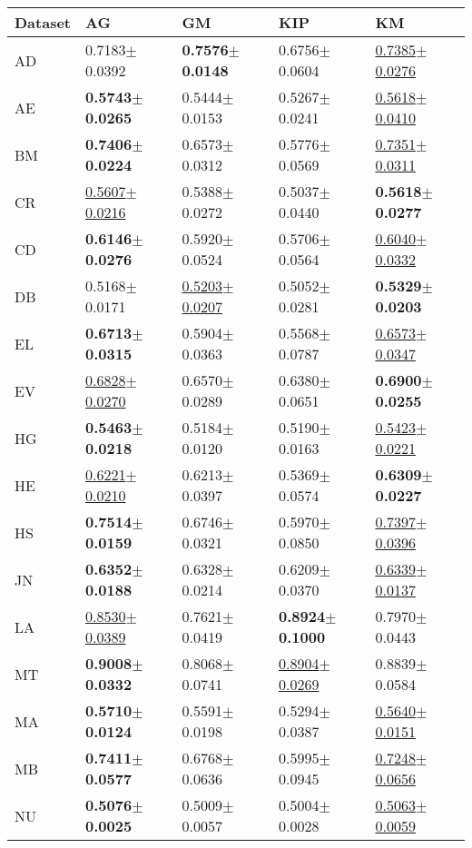 \begin{tabular}{lllll}
\toprule
Dataset & AG & GM & KIP & KM \\
\midrule
AD & 0.7183$\pm$0.0392 & \textbf{0.7576$\pm$0.0148} & 0.6756$\pm$0.0604 & \underline{0.7385$\pm$0.0276} \\
AE & \textbf{0.5743$\pm$0.0265} & 0.5444$\pm$0.0153 & 0.5267$\pm$0.0241 & \underline{0.5618$\pm$0.0410} \\
BM & \textbf{0.7406$\pm$0.0224} & 0.6573$\pm$0.0312 & 0.5776$\pm$0.0569 & \underline{0.7351$\pm$0.0311} \\
CR & \underline{0.5607$\pm$0.0216} & 0.5388$\pm$0.0272 & 0.5037$\pm$0.0440 & \textbf{0.5618$\pm$0.0277} \\
CD & \textbf{0.6146$\pm$0.0276} & 0.5920$\pm$0.0524 & 0.5706$\pm$0.0564 & \underline{0.6040$\pm$0.0332} \\
DB & 0.5168$\pm$0.0171 & \underline{0.5203$\pm$0.0207} & 0.5052$\pm$0.0281 & \textbf{0.5329$\pm$0.0203} \\
EL & \textbf{0.6713$\pm$0.0315} & 0.5904$\pm$0.0363 & 0.5568$\pm$0.0787 & \underline{0.6573$\pm$0.0347} \\
EV & \underline{0.6828$\pm$0.0270} & 0.6570$\pm$0.0289 & 0.6380$\pm$0.0651 & \textbf{0.6900$\pm$0.0255} \\
HG & \textbf{0.5463$\pm$0.0218} & 0.5184$\pm$0.0120 & 0.5190$\pm$0.0163 & \underline{0.5423$\pm$0.0221} \\
HE & \underline{0.6221$\pm$0.0210} & 0.6213$\pm$0.0397 & 0.5369$\pm$0.0574 & \textbf{0.6309$\pm$0.0227} \\
HS & \textbf{0.7514$\pm$0.0159} & 0.6746$\pm$0.0321 & 0.5970$\pm$0.0850 & \underline{0.7397$\pm$0.0396} \\
JN & \textbf{0.6352$\pm$0.0188} & 0.6328$\pm$0.0214 & 0.6209$\pm$0.0370 & \underline{0.6339$\pm$0.0137} \\
LA & \underline{0.8530$\pm$0.0389} & 0.7621$\pm$0.0419 & \textbf{0.8924$\pm$0.1000} & 0.7970$\pm$0.0443 \\
MT & \textbf{0.9008$\pm$0.0332} & 0.8068$\pm$0.0741 & \underline{0.8904$\pm$0.0269} & 0.8839$\pm$0.0584 \\
MA & \textbf{0.5710$\pm$0.0124} & 0.5591$\pm$0.0198 & 0.5294$\pm$0.0387 & \underline{0.5640$\pm$0.0151} \\
MB & \textbf{0.7411$\pm$0.0577} & 0.6768$\pm$0.0636 & 0.5995$\pm$0.0945 & \underline{0.7248$\pm$0.0656} \\
NU & \textbf{0.5076$\pm$0.0025} & 0.5009$\pm$0.0057 & 0.5004$\pm$0.0028 & \underline{0.5063$\pm$0.0059} \\

\end{tabular}
